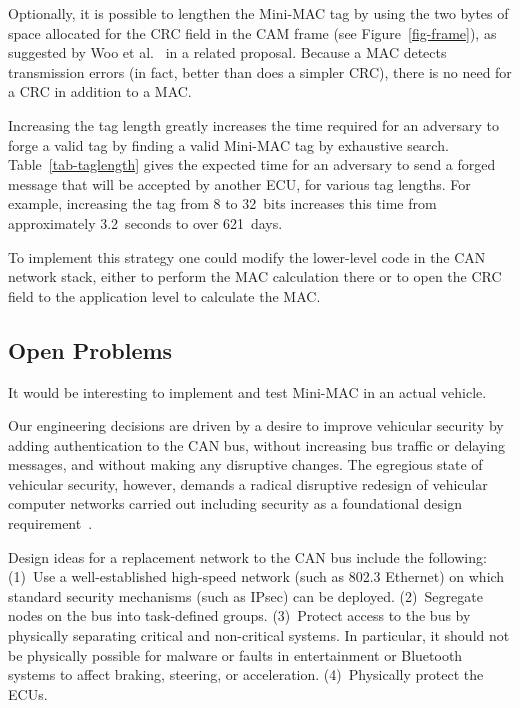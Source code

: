 Optionally, it is possible to lengthen the Mini-MAC tag by 
using the two bytes of space allocated for the CRC field in the CAM frame (see Figure~\ref{fig-frame}),
as suggested by Woo et al.~\cite{Woo-14} in a related proposal.
Because a MAC detects transmission errors (in fact, better than does a simpler CRC), there is no need for
a CRC in addition to a MAC.  

Increasing the tag length greatly increases the time required for an adversary to forge a valid tag by
finding a valid Mini-MAC tag by exhaustive search.  
Table~\ref{tab-taglength} gives the expected time for an adversary to send a forged message 
that will be accepted by another ECU, for various tag lengths.  
For example, increasing the tag from 8 to 32~bits increases this time from
approximately 3.2~seconds to over 621~days.


To implement this strategy one could modify the lower-level code in the CAN network stack, 
either to perform the MAC calculation there 
or to open the CRC field to the application level to calculate the MAC.

\subsection{Open Problems}
\label{open}

It would be interesting to implement and test Mini-MAC in an actual vehicle.

Our engineering decisions are driven by a desire to improve vehicular security by adding authentication
to the CAN bus, without increasing bus traffic or delaying messages, and without making any
disruptive changes.  The egregious state of vehicular security, however, demands a radical disruptive
redesign of vehicular computer networks carried out including security as a foundational design
requirement~\cite{Wolf2006}. 

Design ideas for a replacement network to the CAN bus include the following:  
(1)~Use a well-established high-speed network (such as 802.3 Ethernet) on which
standard security mechanisms (such as IPsec) can be deployed.
(2)~Segregate nodes on the bus into task-defined groups.
(3)~Protect access to the bus by physically separating critical and non-critical systems.
In particular, it should not be physically possible for malware or faults in entertainment or 
Bluetooth systems to affect braking, steering, or acceleration. 
(4)~Physically protect the ECUs. 

